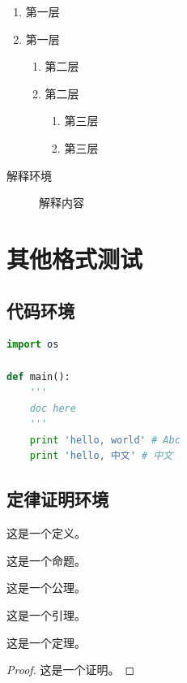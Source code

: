 \documentclass[format=draft,language=chinese,category=SDN]{hustreport}
\begin{document}
\begin{enumerate}
    \item 第一层\label{item:1}
    \item 第一层
    \begin{enumerate}
        \item 第二层\label{item:2}
        \item 第二层
        \begin{enumerate}
            \item 第三层\label{item:3}
            \item 第三层
        \end{enumerate}
    \end{enumerate}
\end{enumerate}

\begin{description}
    \item[解释环境]  解释内容
\end{description}

\chapter{其他格式测试}

\section{代码环境}

\begin{lstlisting}[language=python]
import os

def main():
    '''
    doc here
    '''
    print 'hello, world' # Abc
    print 'hello, 中文' # 中文
\end{lstlisting}

\section{定律证明环境}

\begin{definition}\label{def:1}
这是一个定义。
\end{definition}
\begin{proposition}\label{proposition:1}
这是一个命题。
\end{proposition}
\begin{axiom}\label{axiom:1}
这是一个公理。
\end{axiom}
\begin{lemma}\label{lemma:1}
这是一个引理。
\end{lemma}
\begin{theorem}\label{theorem:1}
这是一个定理。
\end{theorem}
\begin{proof}\label{proof:1}
这是一个证明。
\end{proof}
\end{document}
